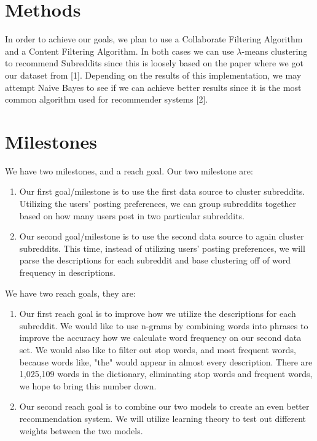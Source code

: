 \documentclass{article}
\begin{document}
\section{Methods}
In order to achieve our goals, we plan to use a Collaborate Filtering Algorithm and a Content Filtering Algorithm. In both cases we can use $\lambda$-means clustering to recommend Subreddits since this is loosely based on the paper where we got our dataset from [1]. Depending on the results of this implementation, we may attempt Naive Bayes to see if we can achieve better results since it is the most common algorithm used for recommender systems [2].

\section{Milestones}

We have two milestones, and a reach goal. Our two milestone are:
\begin{enumerate}
\item Our first goal/milestone is to use the first data source to cluster subreddits.  Utilizing the users' posting preferences, we can group subreddits together based on how many users post in two particular subreddits. 
\item Our second goal/milestone is to use the second data source to again cluster subreddits.  This time, instead of utilizing users' posting preferences, we will parse the descriptions for each subreddit and base clustering off of word frequency in descriptions.  
\end{enumerate}

We have two reach goals, they are:
\begin{enumerate}
\item Our first reach goal is to improve how we utilize the descriptions for each subreddit.  We would like to use n-grams by combining words into phrases to improve the accuracy how we calculate word frequency on our second data set. We would also like to filter out stop words, and most frequent words, because words like, "the" would appear in almost every description. There are 1,025,109 words in the dictionary, eliminating stop words and frequent words, we hope to bring this number down.  
\item Our second reach goal is to combine our two models to create an even better recommendation system.  We will utilize learning theory to test out different weights between the two models.
\end{enumerate}
\end{document}
